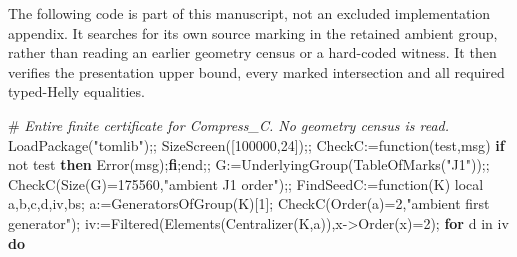 \documentclass[
  10pt,
  letterpaper,
]{article}
\newenvironment{Shaded}{}{}
\newcommand{\BuiltInTok}[1]{\textcolor[rgb]{0.00,0.50,0.00}{#1}}
\newcommand{\CommentTok}[1]{\textcolor[rgb]{0.38,0.63,0.69}{\textit{#1}}}
\newcommand{\ConstantTok}[1]{\textcolor[rgb]{0.53,0.00,0.00}{#1}}
\newcommand{\ControlFlowTok}[1]{\textcolor[rgb]{0.00,0.44,0.13}{\textbf{#1}}}
\newcommand{\ExtensionTok}[1]{#1}
\newcommand{\FloatTok}[1]{\textcolor[rgb]{0.25,0.63,0.44}{#1}}
\newcommand{\FunctionTok}[1]{\textcolor[rgb]{0.02,0.16,0.49}{#1}}
\newcommand{\NormalTok}[1]{#1}
\newcommand{\OperatorTok}[1]{\textcolor[rgb]{0.40,0.40,0.40}{#1}}
\newcommand{\StringTok}[1]{\textcolor[rgb]{0.25,0.44,0.63}{#1}}
\newcommand{\VariableTok}[1]{\textcolor[rgb]{0.10,0.09,0.49}{#1}}
\begin{document}
The following code is part of this manuscript, not an excluded
implementation appendix. It searches for its own source marking in the
retained ambient group, rather than reading an earlier geometry census
or a hard-coded witness. It then verifies the presentation upper bound,
every marked intersection and all required typed-Helly equalities.

\begin{Shaded}
\begin{Highlighting}[]
\NormalTok{\#}\CommentTok{ Entire finite certificate for Compress\_C. No geometry census is read.}
\BuiltInTok{LoadPackage}\NormalTok{(}\StringTok{"tomlib"}\NormalTok{)}\OperatorTok{;;}
\BuiltInTok{SizeScreen}\NormalTok{([}\FloatTok{100000}\OperatorTok{,}\FloatTok{24}\NormalTok{])}\OperatorTok{;;}
\VariableTok{CheckC}\OperatorTok{:=}\FunctionTok{function}\NormalTok{(}\VariableTok{test}\OperatorTok{,}\VariableTok{msg}\NormalTok{) }\ControlFlowTok{if} \ConstantTok{not} \VariableTok{test} \ControlFlowTok{then} \BuiltInTok{Error}\NormalTok{(}\VariableTok{msg}\NormalTok{)}\OperatorTok{;}\ControlFlowTok{fi}\OperatorTok{;}\FunctionTok{end}\OperatorTok{;;}
\VariableTok{G}\OperatorTok{:=}\BuiltInTok{UnderlyingGroup}\NormalTok{(}\BuiltInTok{TableOfMarks}\NormalTok{(}\StringTok{"J1"}\NormalTok{))}\OperatorTok{;;}
\VariableTok{CheckC}\NormalTok{(}\BuiltInTok{Size}\NormalTok{(}\VariableTok{G}\NormalTok{)}\OperatorTok{=}\FloatTok{175560}\OperatorTok{,}\StringTok{"ambient J1 order"}\NormalTok{)}\OperatorTok{;;}
\VariableTok{FindSeedC}\OperatorTok{:=}\FunctionTok{function}\NormalTok{(}\VariableTok{K}\NormalTok{)}
 \ExtensionTok{local} \VariableTok{a}\OperatorTok{,}\VariableTok{b}\OperatorTok{,}\VariableTok{c}\OperatorTok{,}\VariableTok{d}\OperatorTok{,}\VariableTok{iv}\OperatorTok{,}\VariableTok{bs}\OperatorTok{;}
 \VariableTok{a}\OperatorTok{:=}\BuiltInTok{GeneratorsOfGroup}\NormalTok{(}\VariableTok{K}\NormalTok{)[}\FloatTok{1}\NormalTok{]}\OperatorTok{;}
 \VariableTok{CheckC}\NormalTok{(}\BuiltInTok{Order}\NormalTok{(}\VariableTok{a}\NormalTok{)}\OperatorTok{=}\FloatTok{2}\OperatorTok{,}\StringTok{"ambient first generator"}\NormalTok{)}\OperatorTok{;}
 \VariableTok{iv}\OperatorTok{:=}\BuiltInTok{Filtered}\NormalTok{(}\BuiltInTok{Elements}\NormalTok{(}\BuiltInTok{Centralizer}\NormalTok{(}\VariableTok{K}\OperatorTok{,}\VariableTok{a}\NormalTok{))}\OperatorTok{,}\VariableTok{x}\OperatorTok{{-}\textgreater{}}\BuiltInTok{Order}\NormalTok{(}\VariableTok{x}\NormalTok{)}\OperatorTok{=}\FloatTok{2}\NormalTok{)}\OperatorTok{;}
 \ControlFlowTok{for} \VariableTok{d} \ExtensionTok{in} \VariableTok{iv} \ControlFlowTok{do}

\end{Highlighting}
\end{Shaded}
\end{document}
